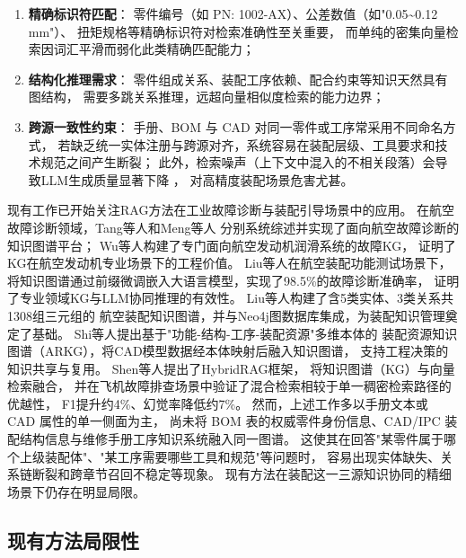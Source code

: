 \begin{enumerate}
  \item \textbf{精确标识符匹配}：
        零件编号（如 PN: 1002-AX）、公差数值（如"0.05\textasciitilde0.12\,mm"）、
        扭矩规格等精确标识符对检索准确性至关重要，
        而单纯的密集向量检索因词汇平滑而弱化此类精确匹配能力；
  \item \textbf{结构化推理需求}：
        零件组成关系、装配工序依赖、配合约束等知识天然具有图结构，
        需要多跳关系推理，远超向量相似度检索的能力边界；
  \item \textbf{跨源一致性约束}：
        手册、BOM 与 CAD 对同一零件或工序常采用不同命名方式，
        若缺乏统一实体注册与跨源对齐，系统容易在装配层级、工具要求和技术规范之间产生断裂；
        此外，检索噪声（上下文中混入的不相关段落）会导致LLM生成质量显著下降
        \cite{liu2023lostinmiddle}，
        对高精度装配场景危害尤甚。
\end{enumerate}

现有工作已开始关注RAG方法在工业故障诊断与装配引导场景中的应用。
在航空故障诊断领域，Tang等人\cite{tang2023aircraft}和Meng等人\cite{meng2024aircraft}
分别系统综述并实现了面向航空故障诊断的知识图谱平台；
Wu等人\cite{wu2024engine}构建了专门面向航空发动机润滑系统的故障KG，
证明了KG在航空发动机专业场景下的工程价值。
Liu等人\cite{liu2024jointkg}在航空装配功能测试场景下，
将知识图谱通过前缀微调嵌入大语言模型，实现了98.5\%的故障诊断准确率，
证明了专业领域KG与LLM协同推理的有效性。
Liu等人\cite{liu2023avkg}构建了含5类实体、3类关系共1308组三元组的
航空装配知识图谱，并与Neo4j图数据库集成，为装配知识管理奠定了基础。
Shi等人\cite{shi2022arkg}提出基于"功能-结构-工序-装配资源"多维本体的
装配资源知识图谱（ARKG），将CAD模型数据经本体映射后融入知识图谱，
支持工程决策的知识共享与复用。
Shen等人\cite{shen2025hybridrag}提出了HybridRAG框架，
将知识图谱（KG）与向量检索融合，
并在飞机故障排查场景中验证了混合检索相较于单一稠密检索路径的优越性，
F1提升约4\%、幻觉率降低约7\%。
然而，上述工作多以手册文本或 CAD 属性的单一侧面为主，
尚未将 BOM 表的权威零件身份信息、CAD/IPC 装配结构信息与维修手册工序知识系统融入同一图谱。
这使其在回答"某零件属于哪个上级装配体"、"某工序需要哪些工具和规范"等问题时，
容易出现实体缺失、关系链断裂和跨章节召回不稳定等现象。
现有方法在装配这一三源知识协同的精细场景下仍存在明显局限。

\subsection{现有方法局限性}
\label{sec:limitation}

